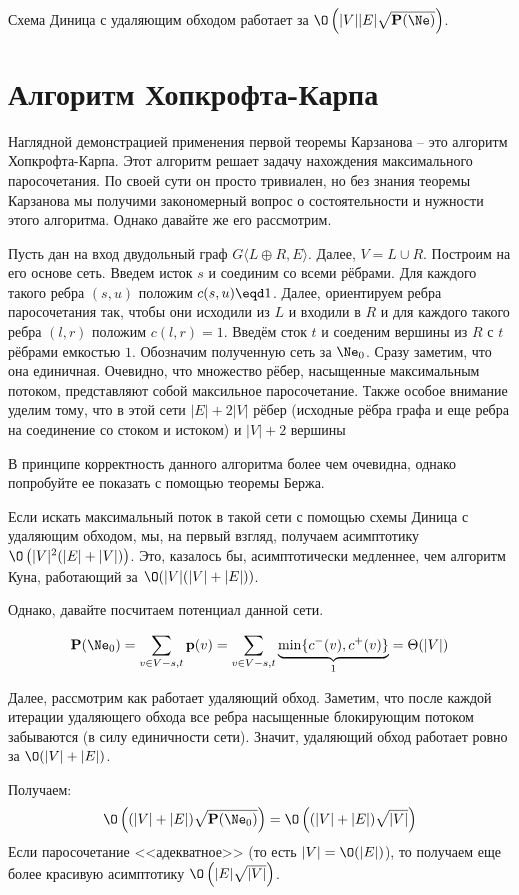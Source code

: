 \Cons Схема Диница с удаляющим обходом работает за $\O\left( |V||E| \sqrt{\P(\Ne)} \right)$.

\section{Алгоритм Хопкрофта-Карпа}

Наглядной демонстрацией применения первой теоремы Карзанова -- это алгоритм Хопкрофта-Карпа. Этот алгоритм решает задачу нахождения максимального паросочетания.
По своей сути он просто тривиален, но без знания теоремы Карзанова мы получими закономерный вопрос о состоятельности и нужности этого алгоритма. Однако давайте же его рассмотрим.

Пусть дан на вход двудольный граф $G\langle L \oplus R, E \rangle$. Далее, $V = L \cup R$. Построим на его основе сеть. Введем исток $s$ и соединим со всеми рёбрами.
Для каждого такого ребра $(s, u)$ положим $c(s, u) \eqd 1$. Далее, ориентируем ребра паросочетания так, чтобы они исходили из $L$ и входили в $R$ и для каждого такого ребра $(l, r)$ положим $c(l, r) = 1$.
Введём сток $t$ и соеденим вершины из $R$ с $t$ рёбрами емкостью $1$. Обозначим полученную сеть за $\Ne_0$. Сразу заметим, что она единичная. Очевидно, что множество рёбер, насыщенные максимальным потоком, представляют собой максильное паросочетание.
Также особое внимание уделим тому, что в этой сети $|E| + 2 |V|$ рёбер (исходные рёбра графа и еще ребра на соединение со стоком и истоком) и $|V| + 2$ вершины

\Exe В принципе корректность данного алгоритма более чем очевидна, однако попробуйте ее показать с помощью теоремы Бержа.

Если искать максимальный поток в такой сети с помощью схемы Диница с удаляющим обходом, мы, на первый взгляд, получаем асимптотику $\O\left(|V|^2(|E| + |V|)\right)$. Это, казалось бы, асимптотически медленнее, чем алгоритм Куна, работающий за $\O(|V|(|V| + |E|))$.

Однако, давайте посчитаем потенциал данной сети.

\begin{equation*}
    \P(\Ne_0) = \sum\limits_{v \in V - s, t} \p(v) = \sum\limits_{v \in V - s, t} \underbrace{\min \{ c^-(v), c^+(v) \}}_{1} = \Theta(|V|)
\end{equation*}

Далее, рассмотрим как работает удаляющий обход. Заметим, что после каждой итерации удаляющего обхода все ребра насыщенные блокирующим потоком забываются (в силу единичности сети). Значит, удаляющий обход работает ровно за $\O(|V| + |E|)$.

Получаем:
\begin{equation*}
    \O\left( (|V| + |E|) \sqrt{\P(\Ne_0)} \right) = \O\left( (|V| + |E|) \sqrt{|V|} \right)
\end{equation*}
Если паросочетание <<адекватное>> (то есть $|V| = \O(|E|)$), то получаем еще более красивую асимптотику $\O\left(|E| \sqrt{|V|}\right)$.

\endgroup
